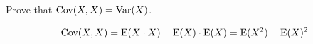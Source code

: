\question Prove that $\text{Cov}(X, X) = \text{Var}(X)$.
\begin{solution}[.5cm]
	\[\text{Cov}(X, X) = \text{E} (X \cdot X) - \text{E} (X) \cdot \text{E}(X) = \text{E}(X^2) - \text{E}(X)^2\]
\end{solution}